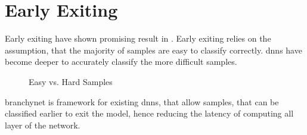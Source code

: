 \chapter{Early Exiting}

Early exiting have shown promising result in \cite{teerapittayanon_branchynet:_2016, teerapittayanon_distributed_2017, huang_multi-scale_2017}. Early exiting relies on the assumption, that the majority of samples are easy to classify correctly. \gls{dnn}s have become deeper to accurately classify the more difficult samples.

\begin{figure}
	\captionsetup[subfigure]{justification=centering}
	\centering
	\caption[Easy vs. Hard Samples]{Easy vs. Hard Samples}
	\label{fig:hardvseasydog}
\end{figure}



\gls{branchynet} \cite{teerapittayanon_branchynet:_2016} is framework  for existing \gls{dnn}s, that allow samples, that can be classified earlier to exit the model, hence reducing the latency of computing all layer of the network.


